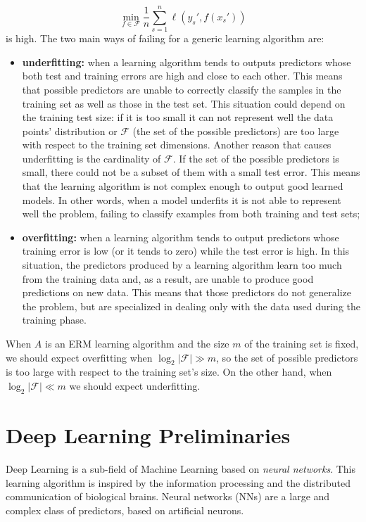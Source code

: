 \begin{equation}
\min_{f \in \mathcal{F}} \frac{1}{n} \sum_{s = 1}^{n} \ell(y_s', f(x_s'))
\end{equation} 
is high. The two main ways of failing for a generic learning algorithm are:
\begin{itemize}
	\item \textbf{underfitting:} when a learning algorithm tends to outputs predictors whose both test and training errors are high and close to each other. This means that possible predictors are unable to correctly classify the samples in the training set as well as those in the test set. This situation could depend on the training test size: if it is too small it can not represent well the data points' distribution or $\mathcal{F}$ (the set of the possible predictors) are too large with respect to the training set dimensions. Another reason that causes underfitting is the cardinality of $\mathcal{F}$. If the set of the possible predictors is small, there could not be a subset of them with a small test error. This means that the learning algorithm is not complex enough to output good learned models. In other words, when a model underfits it is not able to represent well the problem, failing to classify examples from both training and test sets;
	\item \textbf{overfitting:} when a learning algorithm tends to output predictors whose training error is low (or it tends to zero) while the test error is high. In this situation, the predictors produced by a learning algorithm learn too much from the training data and, as a result, are unable to produce good predictions on new data. This means that those predictors do not generalize the problem, but are specialized in dealing only with the data used during the training phase.
\end{itemize}

When $A$ is an ERM learning algorithm and the size $m$ of the training set is fixed, we should expect overfitting when $\log_2|\mathcal{F}| \gg m$, so the set of possible predictors is too large with respect to the training set's size. On the other hand, when $\log_2|\mathcal{F}| \ll m$ we should expect underfitting.

\section{Deep Learning Preliminaries}
Deep Learning is a sub-field of Machine Learning based on \textit{neural networks}. This learning algorithm is inspired by the information processing and the distributed communication of biological brains. Neural networks (NNs) are a large and complex class of predictors, based on artificial neurons.


